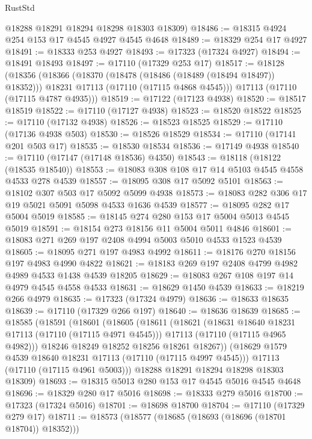 \begin{lexlean}{RustStd}
\begin{coremodule}
      @18288
      @18291
      @18294
      @18298
      @18303
      @18309)
@18486 := @18315 @4924 @254 @153 @17 @4545 @4927 @4545 @4648
@18489 := @18329 @254 @17 @4927
@18491 := @18333 @253 @4927
@18493 := @17323 (@17324 @4927)
@18494 := @18491 @18493
@18497 := @17110 (@17329 @253 @17)
@18517 := @18128
    (@18356
      (@18366
        (@18370 (@18478 (@18486 (@18489 (@18494 @18497)) @18352)))
        @18231
        @17113
        (@17110 (@17115 @4868 @4545)))
      @17113
      (@17110 (@17115 @4787 @4935)))
@18519 := @17122 (@17123 @4938)
@18520 := @18517 @18519
@18522 := @17110 (@17127 @4938)
@18523 := @18520 @18522
@18525 := @17110 (@17132 @4938)
@18526 := @18523 @18525
@18529 := @17110 (@17136 @4938 @503)
@18530 := @18526 @18529
@18534 := @17110 (@17141 @201 @503 @17)
@18535 := @18530 @18534
@18536 := @17149 @4938
@18540 := @17110 (@17147 (@17148 @18536) @4350)
@18543 := @18118 (@18122 (@18535 @18540))
@18553 := @18083 @308 @108 @17 @14 @5103 @4545 @4558 @4533 @278 @4539
@18557 := @18095 @308 @17 @5092 @5101
@18563 := @18102 @307 @503 @17 @5092 @5099 @4938
@18573 := @18083 @282 @306 @17 @19 @5021 @5091 @5098 @4533 @1636 @4539
@18577 := @18095 @282 @17 @5004 @5019
@18585 := @18145 @274 @280 @153 @17 @5004 @5013 @4545 @5019
@18591 := @18154 @273 @18156 @11 @5004 @5011 @4846
@18601 := @18083 @271 @269 @197 @2408 @4994 @5003 @5010 @4533 @1523 @4539
@18605 := @18095 @271 @197 @4983 @4992
@18611 := @18176 @270 @18156 @197 @4983 @4990 @4822
@18621 := @18183 @269 @197 @2408 @4799 @4982 @4989 @4533 @1438 @4539 @18205
@18629 := @18083 @267 @108 @197 @14 @4979 @4545 @4558 @4533
@18631 := @18629 @1450 @4539
@18633 := @18219 @266 @4979
@18635 := @17323 (@17324 @4979)
@18636 := @18633 @18635
@18639 := @17110 (@17329 @266 @197)
@18640 := @18636 @18639
@18685 := @18585
    (@18591
      (@18601
        (@18605
          (@18611
            (@18621
              (@18631 @18640 @18231 @17113 (@17110 (@17115 @4971 @4545)))
              @17113
              (@17110 (@17115 @4965 @4982)))
            @18246
            @18249
            @18252
            @18256
            @18261
            @18267))
        (@18629 @1579 @4539 @18640 @18231 @17113 (@17110 (@17115 @4997 @4545)))
        @17113
        (@17110 (@17115 @4961 @5003)))
      @18288
      @18291
      @18294
      @18298
      @18303
      @18309)
@18693 := @18315 @5013 @280 @153 @17 @4545 @5016 @4545 @4648
@18696 := @18329 @280 @17 @5016
@18698 := @18333 @279 @5016
@18700 := @17323 (@17324 @5016)
@18701 := @18698 @18700
@18704 := @17110 (@17329 @279 @17)
@18711 := @18573 (@18577 (@18685 (@18693 (@18696 (@18701 @18704)) @18352)))

\end{coremodule}
\end{lexlean}
